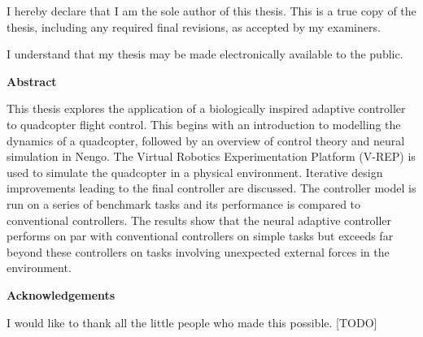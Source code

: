 \cleardoublepage %
 


  \noindent
I hereby declare that I am the sole author of this thesis. This is a true copy of the thesis, including any required final revisions, as accepted by my examiners.

  \bigskip
  
  \noindent
I understand that my thesis may be made electronically available to the public.

\cleardoublepage


\begin{center}\textbf{Abstract}\end{center}

This thesis explores the application of a biologically inspired adaptive controller to quadcopter flight control.
This begins with an introduction to modelling the dynamics of a quadcopter, followed by an overview of control theory and neural simulation in Nengo.
The Virtual Robotics Experimentation Platform (V-REP) is used to simulate the quadcopter in a physical environment.
Iterative design improvements leading to the final controller are discussed.
The controller model is run on a series of benchmark tasks and its performance is compared to conventional controllers. 
The results show that the neural adaptive controller performs on par with conventional controllers on simple tasks but exceeds far beyond these controllers on tasks involving unexpected external forces in the environment.

\cleardoublepage


\begin{center}\textbf{Acknowledgements}\end{center}

I would like to thank all the little people who made this possible. [TODO]
\cleardoublepage

